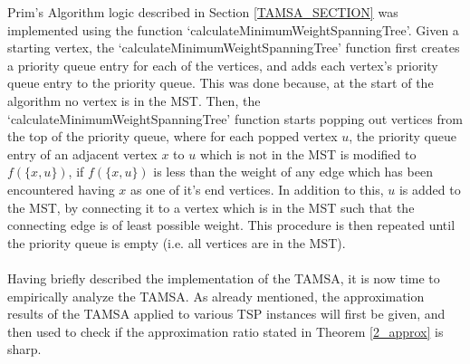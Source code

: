 \documentclass[12pt]{article}
\numberwithin{equation}{subsection}
\numberwithin{table}{subsection}
\numberwithin{algorithm}{subsection}
\numberwithin{figure}{subsection}
\begin{document}
Prim's Algorithm logic described in Section \ref{TAMSA_SECTION} was implemented using the function `calculateMinimumWeightSpanningTree'. Given a starting vertex, the `calculateMinimumWeightSpanningTree' function first creates a priority queue entry for each of the vertices, and adds each vertex's priority queue entry to the priority queue. This was done because, at the start of the algorithm no vertex is in the MST. Then, the `calculateMinimumWeightSpanningTree' function starts popping out vertices from the top of the priority queue, where for each popped vertex $u$, the priority queue entry of an adjacent vertex $x$ to $u$ which is not in the MST is modified to $f(\{x,u\})$, if $f(\{x,u\})$ is less than the weight of any edge which has been encountered having $x$ as one of it's end vertices. In addition to this, $u$ is added to the MST, by connecting it to a vertex which is in the MST such that the connecting edge is of least possible weight. This procedure is then repeated until the priority queue is empty (i.e. all vertices are in the MST). \\\\
Having briefly described the implementation of the TAMSA, it is now time to empirically analyze the TAMSA. As already mentioned, the approximation results of the TAMSA applied to various TSP instances will first be given, and then used to check if the approximation ratio stated in Theorem \ref{2_approx} is sharp.
\end{document}
